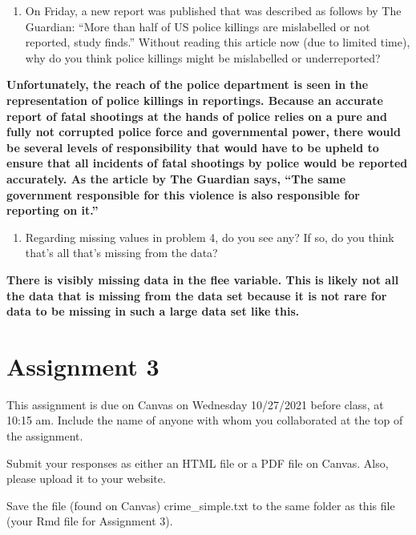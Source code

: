 \documentclass[
]{article}
\providecommand{\tightlist}{%
  \setlength{\itemsep}{0pt}\setlength{\parskip}{0pt}}
\begin{document}
\begin{enumerate}
\def\labelenumi{\alph{enumi}.}
\setcounter{enumi}{1}
\tightlist
\item
  On Friday, a new report was published that was described as follows by
  The Guardian: ``More than half of US police killings are mislabelled
  or not reported, study finds.'' Without reading this article now (due
  to limited time), why do you think police killings might be
  mislabelled or underreported?
\end{enumerate}

\textbf{Unfortunately, the reach of the police department is seen in the
representation of police killings in reportings. Because an accurate
report of fatal shootings at the hands of police relies on a pure and
fully not corrupted police force and governmental power, there would be
several levels of responsibility that would have to be upheld to ensure
that all incidents of fatal shootings by police would be reported
accurately. As the article by The Guardian says, ``The same government
responsible for this violence is also responsible for reporting on
it.''}

\begin{enumerate}
\def\labelenumi{\alph{enumi}.}
\setcounter{enumi}{2}
\tightlist
\item
  Regarding missing values in problem 4, do you see any? If so, do you
  think that's all that's missing from the data?
\end{enumerate}

\textbf{There is visibly missing data in the flee variable. This is
likely not all the data that is missing from the data set because it is
not rare for data to be missing in such a large data set like this.}

\hypertarget{assignment-3}{%
\section{Assignment 3}\label{assignment-3}}

This assignment is due on Canvas on Wednesday 10/27/2021 before class,
at 10:15 am. Include the name of anyone with whom you collaborated at
the top of the assignment.

Submit your responses as either an HTML file or a PDF file on Canvas.
Also, please upload it to your website.

Save the file (found on Canvas) crime\_simple.txt to the same folder as
this file (your Rmd file for Assignment 3).
\end{document}
